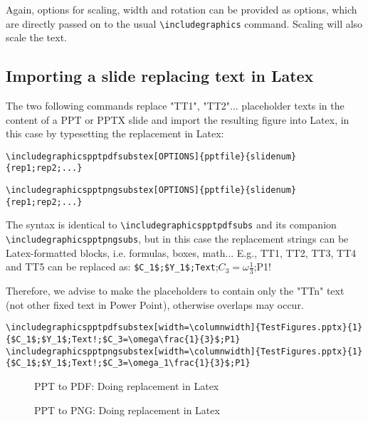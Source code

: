 \documentclass[10pt,,a4paper]{article}
\begin{document}
Again, options for scaling, width and rotation can be provided as options, which are directly passed on to the usual \verb!\includegraphics! command.
Scaling will also scale the text.

\subsection{Importing a slide replacing text in Latex}
The two following commands replace "TT1", "TT2"... placeholder texts in the content of a PPT or PPTX slide and import the resulting figure into Latex, in this case by typesetting the replacement in Latex:
\begin{small}
\begin{verbatim}
\includegraphicspptpdfsubstex[OPTIONS]{pptfile}{slidenum}{rep1;rep2;...}
\end{verbatim}
\end{small}
\begin{small}
\begin{verbatim}
\includegraphicspptpngsubstex[OPTIONS]{pptfile}{slidenum}{rep1;rep2;...}
\end{verbatim}
\end{small}
The syntax is identical to \verb!\includegraphicspptpdfsubs! and its companion \verb!\includegraphicspptpngsubs!, but in this case the replacement strings can be Latex-formatted blocks, i.e. formulas, boxes, math...
E.g., TT1, TT2, TT3, TT4 and TT5 can be replaced as: \verb!$C_1$;$Y_1$;Text!;$C_3=\omega\frac{1}{3}$;P1!

Therefore, we advise to make the placeholders to contain only the "TTn" text (not other fixed text in Power Point), otherwise overlaps may occur.

\begin{scriptsize}\begin{verbatim}
\includegraphicspptpdfsubstex[width=\columnwidth]{TestFigures.pptx}{1}{$C_1$;$Y_1$;Text!;$C_3=\omega\frac{1}{3}$;P1}
\includegraphicspptpngsubstex[width=\columnwidth]{TestFigures.pptx}{1}{$C_1$;$Y_1$;Text!;$C_3=\omega_1\frac{1}{3}$;P1}
\end{verbatim}\end{scriptsize}

\begin{figure}%
%
\caption{PPT to PDF: Doing replacement in Latex}%
\label{}%
\end{figure}
\begin{figure}%
%
\caption{PPT to PNG: Doing replacement in Latex}%
\label{}%
\end{figure}
\end{document}
